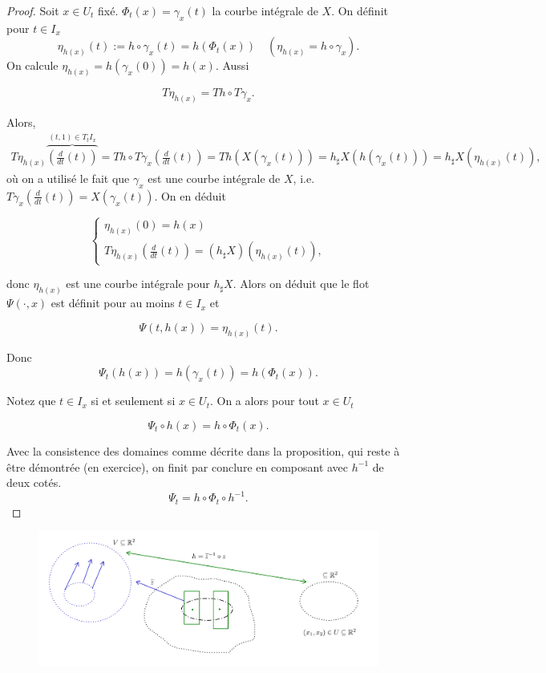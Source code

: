 \documentclass[french]{article}
\theoremstyle{definition}
\begin{document}
\begin{proof}
  Soit $x\in U_t$ fix\'e. \(\Phi_t (x)  = \gamma_x(t)\) la courbe intégrale de \(X\). On d\'efinit pour $t\in I_x$
  \[
  \eta _{h(x)}(t) := h \circ \gamma_x(t) = h(\Phi_t(x)) \quad (\eta _{h(x)} = h \circ \gamma_x).
  \] On calcule \(\eta _{h(x)} = h(\gamma_x(0)) = h(x)\). Aussi

  \[T{\eta _{h(x)}} = T h \circ T \gamma_x.\]

  Alors,
    \begin{gather*}
    T{\eta _{h(x)}} \overbrace{\left( \frac{d}{dt}(t)\right) }^{(t,1)\in T_tI_x} = T h \circ {T{\gamma_x}\left(\frac{d}{dt}(t)\right)}  = Th(X (\gamma_x(t))) = h _{\sharp}X(h(\gamma_x(t))) = h _{\sharp}X(\eta _{h(x)}(t)),
  \end{gather*} o\`u on a utilis\'e  le fait que $\gamma_x$ est une courbe int\'egrale de $X$, i.e. ${T{\gamma_x}\left(\frac{d}{dt}(t)\right)} = X (\gamma_x(t))$.  On en d\'eduit

  \[\begin{cases}
    \eta _{h(x)}(0) = h(x) \\
    T{\eta _{h(x)}}\left(\frac{d}{dt}(t)\right) = (h _{\sharp}X)(\eta _{h(x)}(t)),
  \end{cases}\]

  donc \(\eta _{h(x)}\) est une courbe intégrale pour \(h _{\sharp}X\). Alors on d\'eduit que le flot $\Psi(\cdot ,x)$ est d\'efinit pour au moins $t\in I_x$ et

  \[\Psi(t,h(x)) = \eta _{h(x)}(t).\]

  Donc \[\Psi_t(h(x)) = h(\gamma_x(t)) = h(\Phi_t(x)).\]

 Notez  que $t\in I_x$ si et seulement si  $x\in U_t$. On a alors pour tout $x\in U_t$

  \begin{equation}
    \Psi_t \circ h (x) = h \circ \Phi_t (x).
  \end{equation}

Avec la consistence des domaines comme d\'ecrite dans la proposition, qui reste \`a \^etre d\'emontr\'ee (en exercice), on finit par conclure en composant avec $h^{-1}$ de deux cot\'es.
\[
   \Psi_t = h \circ \Phi_t \circ h^{-1}.
\]
\end{proof}


\begin{figure}[h!]
  \centering
  \includegraphics[scale=0.25]{figures/fig2.png}
  \caption{}
  \label{fig2}
\end{figure}
\end{document}
